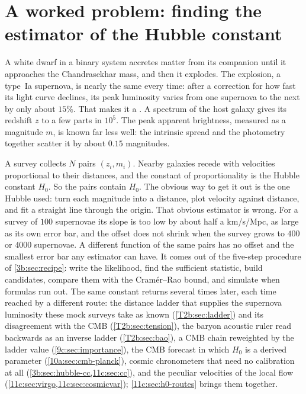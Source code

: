 \section{A worked problem: finding the estimator of the Hubble constant}
\label{3b:sec:hubble}

A white dwarf in a binary system accretes matter from its companion until it
approaches the Chandrasekhar mass, and then it explodes. The explosion, a
type~Ia supernova, is nearly the same every time: after a correction for how
fast its light curve declines, its peak luminosity varies from one supernova
to the next by only about $15\%$. That makes it a 
. A spectrum of the host galaxy gives its redshift $z$
to a few parts in $10^5$. The peak apparent brightness, measured as a
magnitude $m$, is known far less well: the intrinsic spread and the
photometry together scatter it by about $0.15$ magnitudes.

A survey collects $N$ pairs $(z_i,m_i)$. Nearby galaxies recede with
velocities proportional to their distances, and the constant of
proportionality is the Hubble constant $H_0$. So the pairs contain $H_0$.
The obvious way to get it out is the one Hubble used: turn each magnitude
into a distance, plot velocity against distance, and fit a straight line
through the origin. That obvious estimator is wrong. For a survey of $100$
supernovae its slope is too low by about half a km/s/Mpc, as large as its
own error bar, and the offset does not shrink when the survey grows to
$400$ or $4000$ supernovae. A different function of the same pairs has no
offset and the smallest error bar any estimator can have. It comes out of
the five-step procedure of \cref{3b:sec:recipe}: write the likelihood, find
the sufficient statistic, build candidates, compare them with the
Cram\'er--Rao bound, and simulate when formulas run out.
The same constant returns several times later, each time reached by a different route: the distance
ladder that supplies the supernova luminosity these mock surveys take as known
(\cref{T2b:sec:ladder}) and its disagreement with the CMB (\cref{T2b:sec:tension}), the baryon
acoustic ruler read backwards as an inverse ladder (\cref{T2b:sec:bao}), a CMB chain reweighted by the
ladder value (\cref{9c:sec:importance}), the CMB forecast in which $H_0$ is a derived parameter
(\cref{10a:sec:cmb-planck}), cosmic chronometers that need no calibration at all
(\cref{3b:sec:hubble-cc,11c:sec:cc}), and the peculiar velocities of the local flow
(\cref{11c:sec:virgo,11c:sec:cosmicvar}); \cref{11c:sec:h0-routes} brings them together.

